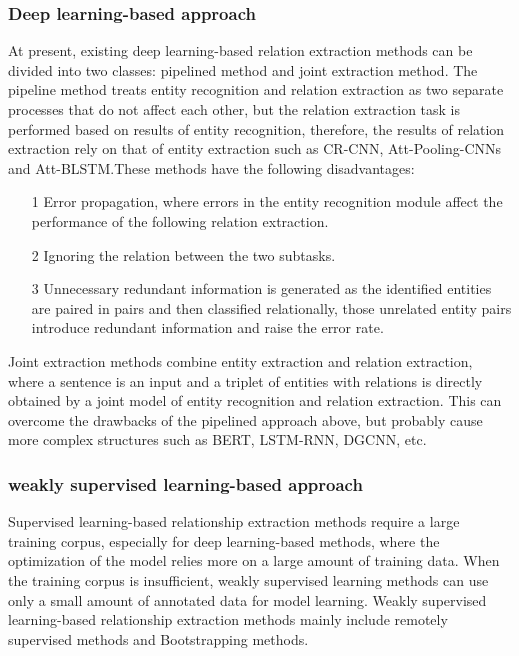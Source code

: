 \documentclass[%
 aip,
 jmp,%
 amsmath,amssymb,
 reprint,%
]{revtex4-2}
\begin{document}
\subsubsection{Deep learning-based approach}
At present, existing deep learning-based relation extraction methods can be divided into two classes:
pipelined method and joint extraction method.
The pipeline method treats entity recognition and relation extraction as two separate processes that 
do not affect each other, but the relation extraction task is performed based on results of entity recognition,
therefore, the results of relation extraction rely on that of entity extraction such as CR-CNN,
Att-Pooling-CNNs and Att-BLSTM.These methods have the following disadvantages:
\begin{itemize}
    \item[1] Error propagation, where errors in the entity recognition module affect the performance of the following relation extraction.
    \item[2] Ignoring the relation between the two subtasks.
    \item[3] Unnecessary redundant information is generated as the identified entities are paired in pairs and then classified relationally, those unrelated entity pairs introduce redundant information and raise the error rate.
\end{itemize}
Joint extraction methods combine entity extraction and relation extraction, where a sentence is an input 
and a triplet of entities with relations is directly obtained by a joint model of entity recognition 
and relation extraction. This can overcome the drawbacks of the pipelined approach above, but probably cause more 
complex structures such as BERT, LSTM-RNN, DGCNN, etc.

\subsubsection{weakly supervised learning-based approach}
Supervised learning-based relationship extraction methods require a large training corpus, 
especially for deep learning-based methods, where the optimization of the model relies more on a 
large amount of training data. When the training corpus is insufficient, weakly supervised learning methods 
can use only a small amount of annotated data for model learning. Weakly supervised learning-based relationship 
extraction methods mainly include remotely supervised methods and Bootstrapping methods.
\end{document}

